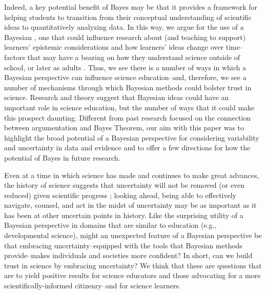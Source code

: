 \documentclass[man]{apa7}
\begin{document}
Indeed, a key potential benefit of Bayes may be that it provides a framework for helping students to transition from their conceptual understanding of scientific ideas to quantitatively analyzing data. In this way, we argue for the use of a Bayesian , one that could influence research about (and teaching to support) learners' epistemic considerations and how learners' ideas change over time--factors that may have a bearing on how they understand science outside of school, or later as adults \parencite{sinatra2014addressing}. Thus, we see there is a number of ways in which a Bayesian perspective can influence science education--and, therefore, we see  a number of mechanisms through which Bayesian methods could bolster trust in science. Research and theory suggest that Bayesian ideas could have an important role in science education, but the number of ways that it could make this prospect daunting. Different from past research focused on the connection between argumentation and Bayes Theorem, our aim with this paper was to highlight the broad potential of a Bayesian perspective for considering variability and uncertainty in data and evidence and to offer a few directions for how the potential of Bayes in future research.

Even at a time in which science has made and continues to make great advances, the history of science suggests that uncertainty will not be removed (or even reduced) given scientific progress \parencite{fara2010science}; looking ahead, being able to effectively navigate, counsel, and act in the midst of uncertainty may be as important as it has been at other uncertain points in history. Like the surprising utility of a Bayesian perspective in domains that are similar to education (e.g., developmental science), might an unexpected feature of a Bayesian perspective be that embracing uncertainty--equipped with the tools that Bayesian methods provide--makes individuals and societies more confident? In short, can we build trust in science by embracing uncertainty? We think that these are questions that are  to yield positive results for science educators and those advocating for a more scientifically-informed citizenry--and for science learners.

\printbibliography
\end{document}
